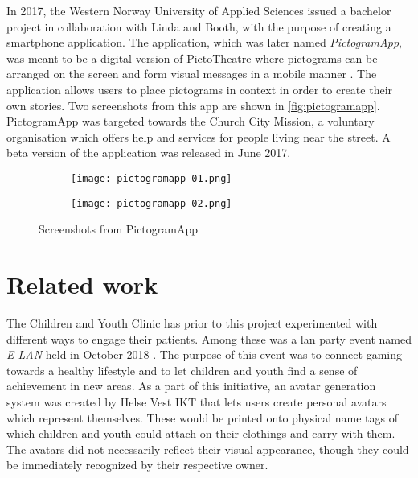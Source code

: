In 2017, the Western Norway University of Applied Sciences issued a bachelor project in collaboration with Linda and Booth, with the purpose of creating a smartphone application. The application, which was later named \emph{PictogramApp}, was meant to be a digital version of PictoTheatre where pictograms can be arranged on the screen and form visual messages in a mobile manner \parencite{fure2017}. The application allows users to place pictograms in context in order to create their own stories. Two screenshots from this app are shown in \autoref{fig:pictogramapp}. PictogramApp was targeted towards the Church City Mission, a voluntary organisation which offers help and services for people living near the street. A beta version of the application was released in June 2017.

\begin{figure}
    \centering
    \hspace{\fill}
    \begin{subfigure}{0.31\textwidth}
        \centering
        \texttt{[image: pictogramapp-01.png]}
        \label{fig:pictogramapp-list}
    \end{subfigure}
    \hspace{\fill}
    \begin{subfigure}{0.31\textwidth}
        \centering
        \texttt{[image: pictogramapp-02.png]}
        \label{fig:pictogramapp-scene}
    \end{subfigure}
    \hspace*{\fill}
    \caption{Screenshots from PictogramApp}
    \label{fig:pictogramapp}
\end{figure}

\section{Related work}
\label{sec:relatedwork}

The Children and Youth Clinic has prior to this project experimented with different ways to engage their patients. Among these was a lan party event named \emph{E-LAN} held in October 2018 \parencite{helsebergen2018}. The purpose of this event was to connect gaming towards a healthy lifestyle and to let children and youth find a sense of achievement in new areas. As a part of this initiative, an avatar generation system was created by Helse Vest IKT that lets users create personal avatars which represent themselves. These would be printed onto physical name tags of which children and youth could attach on their clothings and carry with them. The avatars did not necessarily reflect their visual appearance, though they could be immediately recognized by their respective owner.

